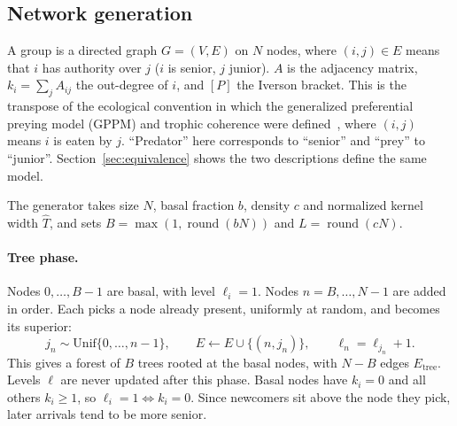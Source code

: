 
\subsection{Network generation}
\label{sec:generation}

A group is a directed graph $G=(V,E)$ on $N$ nodes, where $(i,j)\in E$ means
that $i$ has authority over $j$ ($i$ is senior, $j$ junior). $A$ is the
adjacency matrix, $k_i=\sum_j A_{ij}$ the out-degree of $i$, and $[P]$ the
Iverson bracket. This is the transpose of the ecological convention in which
the generalized preferential preying model (GPPM) and trophic coherence were
defined~\cite{johnson2014trophic,klaise2016neurons}, where $(i,j)$ means
$i$ is eaten by $j$. ``Predator'' here corresponds to ``senior'' and ``prey''
to ``junior''. Section~\ref{sec:equivalence} shows the two descriptions define
the same model.

The generator takes size $N$, basal fraction $b$, density $c$ and normalized
kernel width $\hat T$, and sets $B=\max(1,\operatorname{round}(bN))$ and
$L=\operatorname{round}(cN)$.

\paragraph{Tree phase.}
Nodes $0,\dots,B-1$ are basal, with level $\ell_i=1$. Nodes $n=B,\dots,N-1$
are added in order. Each picks a node already present, uniformly at random,
and becomes its superior:
\begin{equation}
  j_n\sim\mathrm{Unif}\{0,\dots,n-1\},\qquad
  E\leftarrow E\cup\{(n,j_n)\},\qquad
  \ell_n=\ell_{j_n}+1 .
  \label{eq:tree}
\end{equation}
This gives a forest of $B$ trees rooted at the basal nodes, with $N-B$ edges
$E_{\mathrm{tree}}$. Levels $\ell$ are never updated after this phase. Basal
nodes have $k_i=0$ and all others $k_i\ge1$, so $\ell_i=1\iff k_i=0$. Since
newcomers sit above the node they pick, later arrivals tend to be more senior.

